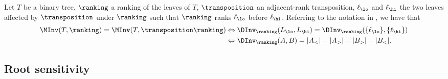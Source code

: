 \documentclass{toc}
\begin{document}
\begin{proposition}\label{prop:sensitivity:criterion}
Let $T$ be a binary tree, $\ranking$ a ranking of the leaves of $T$, $\transposition$ an adjacent-rank transposition, $\ell_\lo$ and $\ell_\hi$ the two leaves affected by $\transposition$ under $\ranking$ such that $\ranking$ ranks $\ell_\lo$ before $\ell_\hi$. Referring to the notation in , we have that 
\begin{align}
\MInv(T,\ranking) = \MInv(T, \transposition \ranking)
&\Leftrightarrow \DInv_\ranking(L_\lo,L_\hi) = \DInv_\ranking(\{\ell_\lo\},\{\ell_\hi\}) \label{eq:criterion:binary:simple} \\
&\Leftrightarrow \DInv_\ranking(A,B) = |A_<| - |A_>| + |B_>| - |B_<|.
\label{eq:criterion:binary:simple:refined}
\end{align}
\end{proposition}

\subsection{Root sensitivity}
\label{sec:sensitivity:root}
\end{document}
